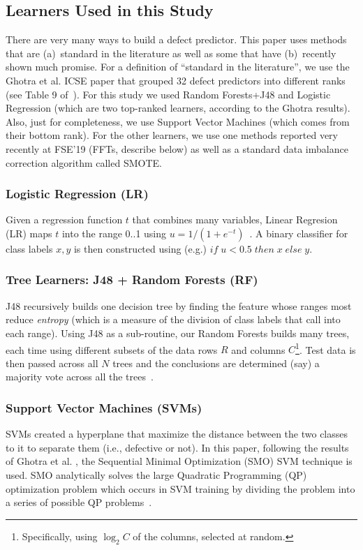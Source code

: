 \documentclass[10pt,journal,compsoc]{IEEEtran}
\begin{document}
\subsection{Learners Used in this Study}\label{tion:learners}
There are very many ways to build a defect predictor.
This paper
uses methods that are (a)~standard in the literature as well as some that
have (b)~recently shown much promise.
For a definition of ``standard in the literature'', we use the Ghotra et al.
ICSE paper that grouped 32 defect predictors into different ranks
(see Table 9 of~\cite{ghotra15}). For this study we used Random Forests+J48  and Logistic Regression (which are two top-ranked 
learners, according to the Ghotra results).
Also, 
 just for completeness, we use Support Vector Machines (which comes from their bottom rank).
For the other learners, we use  one methods reported very recently at FSE'19 
(FFTs, describe below) as well as a standard data imbalance correction
algorithm called SMOTE.

\subsubsection{Logistic Regression (LR)}
Given a  regression function $t$
      that combines many variables, Linear Regresion (LR) maps $t$ into the range 0..1 using $u=1/(1+e^{-t})$~\cite{Witten:2011}. A binary classifier for class labels $x,y$ is then constructed using (e.g.)
 $\mathit{if}\; u<0.5\; \mathit{then}\; x\; \mathit{else}\;y$.
        
\subsubsection{Tree Learners: J48 + Random Forests (RF)}
J48  recursively builds one decision tree by
finding the feature whose ranges most reduce {\em entropy} (which is a measure of the division of class labels that call into each range).
 Using J48 as a sub-routine, our
 Random Forests   builds many trees,
 each time using  different  subsets of
 the  data rows $R$ and columns $C$\footnote{Specifically, using $\log_2{C}$ of the columns, selected at random.}. 
Test data is then passed across all $N$ trees and the conclusions are determined (say) a majority vote across all the trees~\cite{Breiman2001}. 

\subsubsection{Support Vector Machines (SVMs)}
SVMs created a hyperplane that maximize the distance between the two classes to it to separate them (i.e., defective or not). 
        In this paper, following the results of Ghotra et al. \cite{ghotra15}, the Sequential Minimal Optimization
        (SMO) SVM technique is used. SMO analytically solves the large
        Quadratic Programming (QP) optimization problem which
        occurs in SVM training by dividing the problem into a series
        of possible QP problems~\cite{zeng2008fast}.
\end{document}
